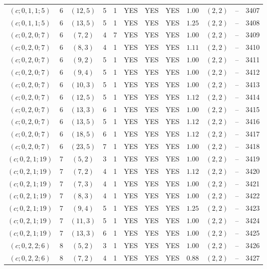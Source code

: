 \begin{longtable}{|c|c|c|c|c|c|c|c|c|c|c|c|}
$(c;0,1,1;5)$ & 6 & $(12,5)$ & 5 & 1 & YES & YES & YES & $1.00$ & $(2,2)$ & -- & 3407\\
$(c;0,1,1;5)$ & 6 & $(13,5)$ & 5 & 1 & YES & YES & YES & $1.25$ & $(2,2)$ & -- & 3408\\
$(c;0,2,0;7)$ & 6 & $(7,2)$ & 4 & 7 & YES & YES & YES & $1.00$ & $(2,2)$ & -- & 3409\\
$(c;0,2,0;7)$ & 6 & $(8,3)$ & 4 & 1 & YES & YES & YES & $1.11$ & $(2,2)$ & -- & 3410\\
$(c;0,2,0;7)$ & 6 & $(9,2)$ & 5 & 1 & YES & YES & YES & $1.00$ & $(2,2)$ & -- & 3411\\
$(c;0,2,0;7)$ & 6 & $(9,4)$ & 5 & 1 & YES & YES & YES & $1.00$ & $(2,2)$ & -- & 3412\\
$(c;0,2,0;7)$ & 6 & $(10,3)$ & 5 & 1 & YES & YES & YES & $1.00$ & $(2,2)$ & -- & 3413\\
$(c;0,2,0;7)$ & 6 & $(12,5)$ & 5 & 1 & YES & YES & YES & $1.12$ & $(2,2)$ & -- & 3414\\
$(c;0,2,0;7)$ & 6 & $(13,3)$ & 6 & 1 & YES & YES & YES & $1.00$ & $(2,2)$ & -- & 3415\\
$(c;0,2,0;7)$ & 6 & $(13,5)$ & 5 & 1 & YES & YES & YES & $1.12$ & $(2,2)$ & -- & 3416\\
$(c;0,2,0;7)$ & 6 & $(18,5)$ & 6 & 1 & YES & YES & YES & $1.12$ & $(2,2)$ & -- & 3417\\
$(c;0,2,0;7)$ & 6 & $(23,5)$ & 7 & 1 & YES & YES & YES & $1.00$ & $(2,2)$ & -- & 3418\\
$(c;0,2,1;19)$ & 7 & $(5,2)$ & 3 & 1 & YES & YES & YES & $1.00$ & $(2,2)$ & -- & 3419\\
$(c;0,2,1;19)$ & 7 & $(7,2)$ & 4 & 1 & YES & YES & YES & $1.12$ & $(2,2)$ & -- & 3420\\
$(c;0,2,1;19)$ & 7 & $(7,3)$ & 4 & 1 & YES & YES & YES & $1.00$ & $(2,2)$ & -- & 3421\\
$(c;0,2,1;19)$ & 7 & $(8,3)$ & 4 & 1 & YES & YES & YES & $1.00$ & $(2,2)$ & -- & 3422\\
$(c;0,2,1;19)$ & 7 & $(9,4)$ & 5 & 1 & YES & YES & YES & $1.25$ & $(2,2)$ & -- & 3423\\
$(c;0,2,1;19)$ & 7 & $(11,3)$ & 5 & 1 & YES & YES & YES & $1.00$ & $(2,2)$ & -- & 3424\\
$(c;0,2,1;19)$ & 7 & $(13,3)$ & 6 & 1 & YES & YES & YES & $1.00$ & $(2,2)$ & -- & 3425\\
$(c;0,2,2;6)$ & 8 & $(5,2)$ & 3 & 1 & YES & YES & YES & $1.00$ & $(2,2)$ & -- & 3426\\
$(c;0,2,2;6)$ & 8 & $(7,2)$ & 4 & 1 & YES & YES & YES & $0.88$ & $(2,2)$ & -- & 3427\\

\end{longtable}
